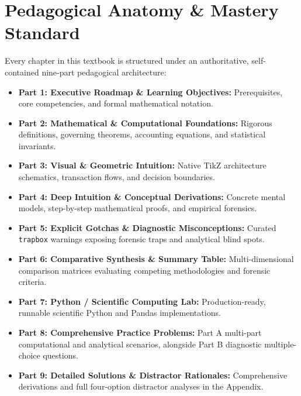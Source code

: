 \documentclass[11pt,a4paper,oneside]{book}
\begin{document}
\section*{Pedagogical Anatomy \& Mastery Standard}
Every chapter in this textbook is structured under an authoritative, self-contained nine-part pedagogical architecture:
\begin{itemize}
    \item \textcolor{primarydark}{\textbf{Part 1: Executive Roadmap \& Learning Objectives:}} Prerequisites, core competencies, and formal mathematical notation.
    \item \textcolor{tealdef}{\textbf{Part 2: Mathematical \& Computational Foundations:}} Rigorous definitions, governing theorems, accounting equations, and statistical invariants.
    \item \textcolor{primarydark}{\textbf{Part 3: Visual \& Geometric Intuition:}} Native TikZ architecture schematics, transaction flows, and decision boundaries.
    \item \textcolor{purpleex}{\textbf{Part 4: Deep Intuition \& Conceptual Derivations:}} Concrete mental models, step-by-step mathematical proofs, and empirical forensics.
    \item \textcolor{amberwarning}{\textbf{Part 5: Explicit Gotchas \& Diagnostic Misconceptions:}} Curated \texttt{trapbox} warnings exposing forensic traps and analytical blind spots.
    \item \textcolor{tealdef}{\textbf{Part 6: Comparative Synthesis \& Summary Table:}} Multi-dimensional comparison matrices evaluating competing methodologies and forensic criteria.
    \item \textcolor{primarydark}{\textbf{Part 7: Python / Scientific Computing Lab:}} Production-ready, runnable scientific Python and Pandas implementations.
    \item \textcolor{purpleex}{\textbf{Part 8: Comprehensive Practice Problems:}} Part A multi-part computational and analytical scenarios, alongside Part B diagnostic multiple-choice questions.
    \item \textcolor{coralformula}{\textbf{Part 9: Detailed Solutions \& Distractor Rationales:}} Comprehensive derivations and full four-option distractor analyses in the Appendix.
\end{itemize}



\mainmatter














\backmatter



\printindex
\end{document}
